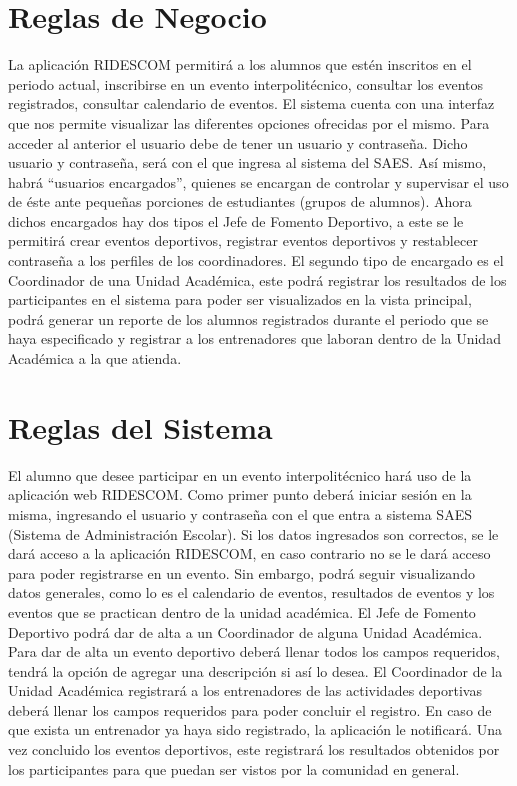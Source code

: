 	\section{Reglas de Negocio}
	\noindent La aplicación RIDESCOM permitirá a los alumnos que estén inscritos en el periodo actual, inscribirse en un evento interpolitécnico, consultar los eventos registrados, consultar calendario de eventos. 
	El sistema cuenta con una interfaz que nos permite visualizar las diferentes opciones ofrecidas por el mismo. Para acceder al anterior el usuario debe de tener un usuario y contraseña. Dicho usuario y contraseña, será con el que ingresa al sistema del SAES. 
	Así mismo, habrá “usuarios encargados”, quienes se encargan de controlar y supervisar el uso de éste ante pequeñas porciones de estudiantes (grupos de alumnos). Ahora dichos encargados hay dos tipos el Jefe de Fomento Deportivo, a este se le permitirá crear eventos deportivos, registrar eventos deportivos y restablecer contraseña a los perfiles de los coordinadores. El segundo tipo de encargado es el Coordinador de una Unidad Académica, este podrá registrar los resultados de los participantes en el sistema para poder ser visualizados en la vista principal, podrá generar un reporte de los alumnos registrados durante el periodo que se haya especificado y registrar a los entrenadores que laboran dentro de la Unidad Académica a la que atienda.
	
	
	\section{Reglas del Sistema}
	\noindent El alumno que desee participar en un evento interpolitécnico hará uso de la aplicación web RIDESCOM. Como primer punto deberá iniciar sesión en la misma, ingresando el usuario y contraseña con el que entra a sistema SAES (Sistema de Administración Escolar). Si los datos ingresados son correctos, se le dará acceso a la aplicación RIDESCOM, en caso contrario no se le dará acceso para poder registrarse en un evento. Sin embargo, podrá seguir visualizando datos generales, como lo es el calendario de eventos, resultados de eventos y los eventos que se practican dentro de la unidad académica.
	El Jefe de Fomento Deportivo podrá dar de alta a un Coordinador de alguna Unidad Académica. Para dar de alta un evento deportivo deberá llenar todos los campos requeridos, tendrá la opción de agregar una descripción si así lo desea. 
	El Coordinador de la Unidad Académica registrará a los entrenadores de las actividades deportivas deberá llenar los campos requeridos para poder concluir el registro. En caso de que exista un entrenador ya haya sido registrado, la aplicación le notificará. Una vez concluido los eventos deportivos, este registrará los resultados obtenidos por los participantes para que puedan ser vistos por la comunidad en general.
	
